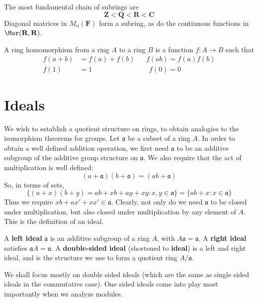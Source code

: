 The most fundamental chain of subrings are
%
\[ \mathbf{Z} < \mathbf{Q} < \mathbf{R} < \mathbf{C} \]
%
Diagonal matrices in $M_n(\mathbf{F})$ form a subring, as do the continuous functions in $\Mor(\mathbf{R}, \mathbf{R})$.

\begin{definition}
    A ring homomorphism from a ring $A$ to a ring $B$ is a function $f:A \to B$ such that
    \begin{align*}
        f(a + b) &= f(a) + f(b) && f(ab) = f(a)f(b)\\
        f(1) &= 1 && \ \ f(0) = 0
    \end{align*}
\end{definition}





\section{Ideals}

We wish to establish a quotient structure on rings, to obtain analogies to the isomorphism theorems for groups. Let $\mathfrak{a}$ be a subset of a ring $A$. In order to obtain a well defined addition operation, we first need $\mathfrak{a}$ to be an additive subgroup of the additive group structure on $\mathfrak{a}$. We also require that the act of multiplication is well defined:
%
\[ (a + \mathfrak{a})(b + \mathfrak{a}) = (ab + \mathfrak{a}) \]
%
So, in terms of sets,
%
\[ \{ (a + x)(b + y) = ab + xb + ay + xy : x,y \in \mathfrak{a} \} = \{ ab + x : x \in \mathfrak{a} \} \]
%
Thus we require $xb + ax' + xx' \in \mathfrak{a}$. Clearly, not only do we need $\mathfrak{a}$ to be closed under multiplication, but also closed under multiplication by any element of $A$. This is the definition of an ideal.

\begin{definition}
    A {\bf left ideal} $\mathfrak{a}$ is an additive subgroup of a ring $A$, with $A\mathfrak{a} = \mathfrak{a}$. A {\bf right ideal} satisfies $\mathfrak{a}A = \mathfrak{a}$. A {\bf double-sided ideal} (shortened to {\bf ideal}) is a left and right ideal, and is the structure we use to form a quotient ring $A/\mathfrak{a}$.
\end{definition}

We shall focus mostly on double sided ideals (which are the same as single sided ideals in the commutative case). One sided ideals come into play most importantly when we analyze modules.

